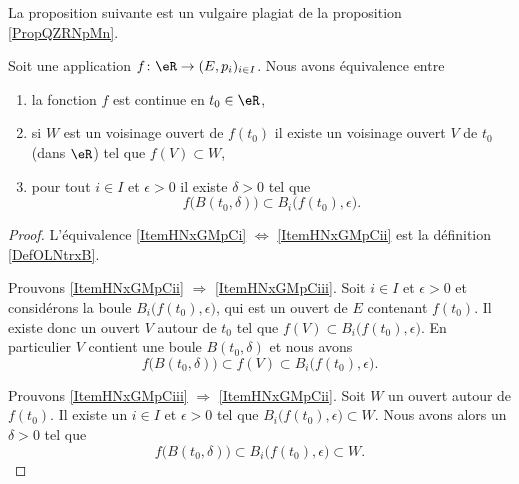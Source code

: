 La proposition suivante est un vulgaire plagiat de la proposition \ref{PropQZRNpMn}.
\begin{proposition} \label{PropNGjQnqF}
    Soit une application \( f\colon \eR\to (E,p_i)_{i\in I}\). Nous avons équivalence entre
    \begin{enumerate}
        \item   \label{ItemHNxGMpCi}
            la fonction \( f\) est continue en \( t_0\in \eR\),
        \item\label{ItemHNxGMpCii}
            si \( W\) est un voisinage ouvert de \( f(t_0)\) il existe un voisinage ouvert \( V\) de \( t_0\) (dans \( \eR\)) tel que \( f(V)\subset W\),
        \item\label{ItemHNxGMpCiii}
            pour tout \( i\in I\) et \( \epsilon>0\) il existe \( \delta>0\) tel que
            \begin{equation}
                f\big( B(t_0,\delta) \big)\subset B_i\big( f(t_0),\epsilon \big).
            \end{equation}
    \end{enumerate}
\end{proposition}

\begin{proof}
    L'équivalence \ref{ItemHNxGMpCi} \( \Leftrightarrow\) \ref{ItemHNxGMpCii} est la définition \ref{DefOLNtrxB}.

    Prouvons \ref{ItemHNxGMpCii} \( \Rightarrow\) \ref{ItemHNxGMpCiii}. Soit \( i\in I\) et \( \epsilon>0\) et considérons la boule \( B_i\big( f(t_0),\epsilon \big)\), qui est un ouvert de \( E\) contenant \( f(t_0)\). Il existe donc un ouvert \( V\) autour de \( t_0\) tel que \( f(V)\subset B_i\big( f(t_0),\epsilon \big)\). En particulier \( V\) contient une boule \( B(t_0,\delta)\) et nous avons
    \begin{equation}
        f\big( B(t_0,\delta) \big)\subset f(V)\subset B_i\big( f(t_0),\epsilon \big).
    \end{equation}

    Prouvons \ref{ItemHNxGMpCiii} \( \Rightarrow\) \ref{ItemHNxGMpCii}. Soit \( W\) un ouvert autour de \( f(t_0)\). Il existe un \( i\in I\) et \( \epsilon>0\) tel que \( B_i\big( f(t_0),\epsilon \big)\subset W\). Nous avons alors un \( \delta>0\) tel que
    \begin{equation}
        f\big( B(t_0,\delta) \big)\subset B_i\big( f(t_0),\epsilon \big)\subset W.
    \end{equation}
\end{proof}

